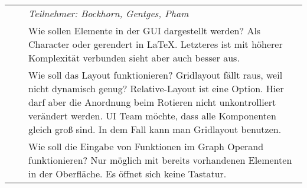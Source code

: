 {\begin{longtable}{|l|l|p{11cm}|}
			\\ & &
			\small{\textit{Teilnehmer: Bockhorn, Gentges, Pham}}
			\\ & &
			Wie sollen Elemente in der GUI dargestellt werden? Als Character oder gerendert in LaTeX. Letzteres ist mit höherer Komplexität verbunden sieht aber auch besser aus. 
			\\ & &
			Wie soll das Layout funktionieren? Gridlayout fällt raus, weil nicht dynamisch genug? Relative-Layout ist eine Option. Hier darf aber die Anordnung beim Rotieren nicht unkontrolliert verändert werden. UI Team möchte, dass alle Komponenten gleich groß sind. In dem Fall kann man Gridlayout benutzen.
			\\ & &
			Wie soll die Eingabe von Funktionen im Graph Operand funktionieren? Nur möglich mit bereits vorhandenen Elementen in der Oberfläche. Es öffnet sich keine Tastatur.
	

\end{longtable}}
